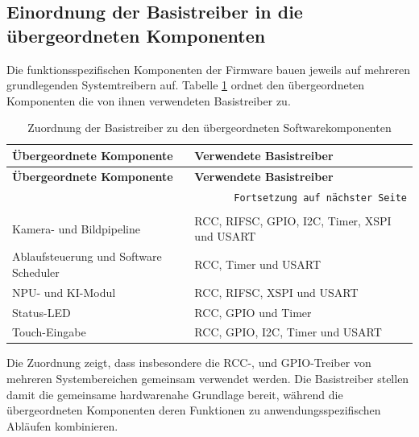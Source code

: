 \subsection{Einordnung der Basistreiber in die übergeordneten Komponenten}\label{sub:treiber-einordnung}

Die funktionsspezifischen Komponenten der Firmware bauen jeweils auf mehreren grundlegenden Systemtreibern auf. Tabelle \ref{tab:treiber-zuordnung} ordnet den übergeordneten Komponenten die von ihnen verwendeten Basistreiber zu.

\begin{longtable}{|p{}|p{}|}
    \hline
    \textbf{Übergeordnete Komponente} & \textbf{Verwendete Basistreiber} \\
    \hline
    \endfirsthead
    \hline
    \textbf{Übergeordnete Komponente} & \textbf{Verwendete Basistreiber} \\
    \hline
    \endhead
    \hline
    \multicolumn{2}{r}{\texttt{Fortsetzung auf nächster Seite}} \\
    \endfoot
    \caption{Zuordnung der Basistreiber zu den übergeordneten Softwarekomponenten}
    \label{tab:treiber-zuordnung} \\
    \endlastfoot
    Kamera- und Bildpipeline               & RCC, RIFSC, GPIO, I2C, Timer, XSPI und USART \\
    \hline
    Ablaufsteuerung und Software Scheduler & RCC, Timer und USART \\
    \hline
    NPU- und KI-Modul                      & RCC, RIFSC, XSPI und USART \\
    \hline
    Status-LED                             & RCC, GPIO und Timer \\
    \hline
    Touch-Eingabe                          & RCC, GPIO, I2C, Timer und USART \\
    \hline
\end{longtable}

Die Zuordnung zeigt, dass insbesondere die RCC-, und GPIO-Treiber von mehreren Systembereichen gemeinsam verwendet werden. Die Basistreiber stellen damit die gemeinsame hardwarenahe Grundlage bereit, während die übergeordneten Komponenten deren Funktionen zu anwendungsspezifischen Abläufen kombinieren.


